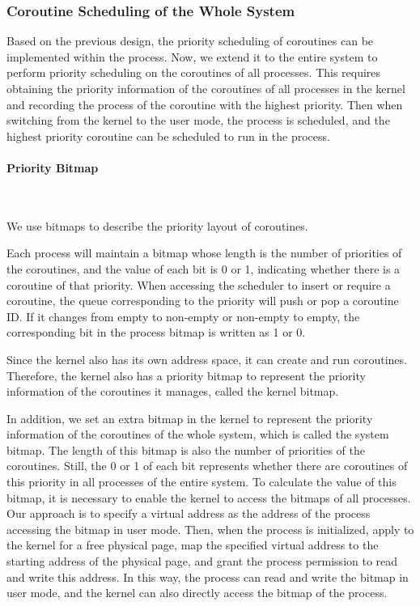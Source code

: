 \documentclass[10pt]{article}
\begin{document}
\subsubsection{Coroutine Scheduling of the Whole System}

Based on the previous design, the priority scheduling of coroutines can be implemented within the process. Now, we extend it to the entire system to perform priority scheduling on the coroutines of all processes. This requires obtaining the priority information of the coroutines of all processes in the kernel and recording the process of the coroutine with the highest priority. Then when switching from the kernel to the user mode, the process is scheduled, and the highest priority coroutine can be scheduled to run in the process.


\paragraph{Priority Bitmap}~{}

We use bitmaps to describe the priority layout of coroutines.

Each process will maintain a bitmap whose length is the number of priorities of the coroutines, and the value of each bit is 0 or 1, indicating whether there is a coroutine of that priority. When accessing the scheduler to insert or require a coroutine, the queue corresponding to the priority will push or pop a coroutine ID. If it changes from empty to non-empty or non-empty to empty, the corresponding bit in the process bitmap is written as 1 or 0.

Since the kernel also has its own address space, it can create and run coroutines. Therefore, the kernel also has a priority bitmap to represent the priority information of the coroutines it manages, called the kernel bitmap.

In addition, we set an extra bitmap in the kernel to represent the priority information of the coroutines of the whole system, which is called the system bitmap. The length of this bitmap is also the number of priorities of the coroutines. Still, the 0 or 1 of each bit represents whether there are coroutines of this priority in all processes of the entire system. To calculate the value of this bitmap, it is necessary to enable the kernel to access the bitmaps of all processes. Our approach is to specify a virtual address as the address of the process accessing the bitmap in user mode. Then, when the process is initialized, apply to the kernel for a free physical page, map the specified virtual address to the starting address of the physical page, and grant the process permission to read and write this address. In this way, the process can read and write the bitmap in user mode, and the kernel can also directly access the bitmap of the process.
\end{document}
